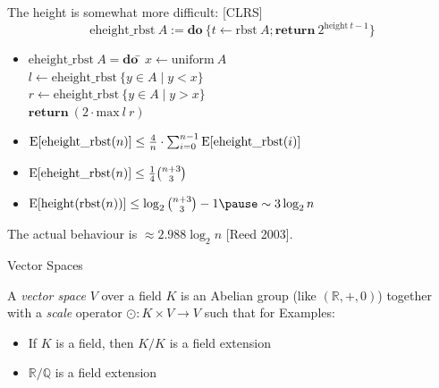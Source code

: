 \documentclass[%
	sans,
	12pt,
]{beamer}
\newcommand{\high}[1]{{\usebeamercolor[fg]{structure} #1}}
\newcommand{\expectation}{\text{\upshape E}}
\begin{document}
\begin{frame}
The height is somewhat more difficult: [CLRS]\pause
\[\text{eheight\_rbst}\ A := \textbf{do}\ \{t \leftarrow \text{rbst}\ A; \textbf{return}\ 2^{\text{height}\ t - 1}\}\]\pause
\vspace*{-1.5em}
\begin{theorem}\upshape
\vspace*{-0.4em}
\begin{itemize}
\item 
\begin{tabbing}
$\text{eheight\_rbst}\ A = \textbf{do}\ $\= $x \leftarrow \text{uniform}\ A$\\
\> $l \leftarrow \text{eheight\_rbst}\ \{y\in A\mid y < x\}$\\
\> $r \leftarrow \text{eheight\_rbst}\ \{y\in A\mid y > x\}$\\
\> $\textbf{return}\ (2 \cdot \text{max}\ l\ r)$
\end{tabbing}
\pause
\item
$\expectation[\text{eheight\_rbst}(n)] \leq \frac{4}{n}\cdot \sum_{i=0}^{n-1} \expectation[\text{eheight\_rbst}(i)]$\pause\\[3mm]
\item
$\expectation[\text{eheight\_rbst}(n)] \leq \frac{1}{4} {{n + 3} \choose 3}$\\[2mm]\pause%
\item
$\expectation[\text{height}(\text{rbst}(n))] \leq \log_2 {{n + 3} \choose 3} - 1\pause \sim 3 \log_2 n$\pause
\end{itemize}
\end{theorem}
The actual behaviour is $\approx 2.988 \log_2 n$ [Reed 2003].

\end{frame}
\begin{frame}
\begin{center}
\huge\high{Vector Spaces}
\end{center}
\end{frame}

\begin{frame}
A \emph{vector space} $V$ over a field $K$ is an Abelian group (like $(\mathbb{R},+,0)$) together with a \emph{scale} operator $\odot:K\times V \to V$ such that for 
Examples:
\begin{itemize}%
\item If $K$ is a field, then $K/K$ is a field extension\pause
\item $\mathbb{R}/\mathbb{Q}$ is a field extension
\end{itemize}
\end{frame}
\end{document}
